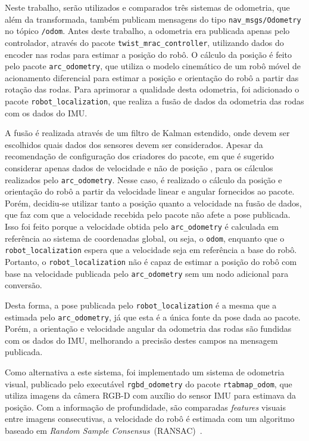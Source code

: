 \documentclass[repeatfields,xlists,xpacks,oneside,yearsonly]{ufrgscca}
\begin{document}
Neste trabalho, serão utilizados e comparados três sistemas de
odometria, que além da transformada, também publicam mensagens do
tipo \texttt{nav\_msgs/Odometry} no tópico \texttt{/odom}. Antes
deste trabalho, a odometria era publicada apenas pelo controlador,
através do pacote \texttt{twist\_mrac\_controller}, utilizando dados
do encoder nas rodas para estimar a posição do robô. O cálculo da
posição é feito pelo pacote \texttt{arc\_odometry}, que utiliza o
modelo cinemático de um robô móvel de acionamento diferencial para
estimar a posição e orientação do robô a partir das rotação das
rodas. Para aprimorar a qualidade desta odometria, foi adicionado o
pacote \texttt{robot\_localization}, que realiza a fusão de dados da
odometria das rodas com os dados do IMU.

A fusão é realizada através de um filtro de Kalman estendido, onde
devem ser escolhidos quais dados dos sensores devem ser considerados.
Apesar da recomendação de configuração dos criadores do pacote, em que
é sugerido considerar apenas dados de velocidade e não de posição
\cite{robot_localization_guide}, para os cálculos realizados pelo
\texttt{arc\_odometry}. Nesse caso, é realizado o cálculo
da posição e orientação do robô a partir da velocidade linear e
angular fornecidos ao pacote. Porém, decidiu-se utilizar tanto a posição quanto a
velocidade na fusão de dados, que faz com que a velocidade recebida pelo
pacote não afete a pose publicada. Isso foi feito porque a velocidade
obtida pelo \texttt{arc\_odometry} é calculada em referência ao
sistema de coordenadas global, ou seja, o \texttt{odom}, enquanto
que o \texttt{robot\_localization} espera que a velocidade seja em
referência a base do robô. Portanto, o \texttt{robot\_localization}
não é capaz de estimar a posição do robô com base na velocidade
publicada pelo \texttt{arc\_odometry} sem um nodo adicional para
conversão.

Desta forma, a pose publicada pelo \texttt{robot\_localization} é a
mesma que a estimada pelo \texttt{arc\_odometry}, já que esta é a
única fonte da pose dada ao pacote. Porém, a orientação e velocidade
angular da odometria das rodas são fundidas com os dados do IMU,
melhorando a precisão destes campos na mensagem publicada.

Como alternativa a este sistema, foi implementado um sistema de
odometria visual, publicado pelo executável \texttt{rgbd\_odometry}
do pacote \texttt{rtabmap\_odom}, que utiliza imagens da câmera RGB-D
com auxílio do sensor IMU para estimava da posição. Com a informação
de profundidade, são comparadas \textit{features} visuais entre
imagens consecutivas, a velocidade do robô é estimada com um
algoritmo baseado em \textit{Random Sample
    Consensus}~(RANSAC)~\cite{rtabmap_odom}.
\end{document}
